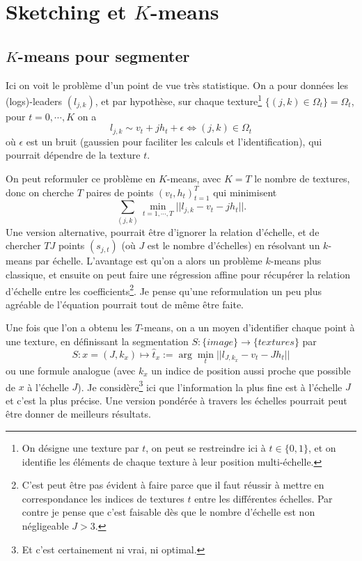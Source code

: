 \documentclass[11pt]{article} %
\begin{document}
\section{Sketching et $K$-means}
\subsection{$K$-means pour segmenter}
Ici on voit le problème d'un point de vue très statistique. On a pour données les (logs)-leaders $(l_{j,k})$, et par hypothèse, sur chaque texture\footnote{On désigne une texture par $t$, on peut se restreindre ici à $t\in \{0,1\}$, et on identifie les éléments de chaque texture à leur position multi-échelle.} $\{(j,k) \in \Omega_t\} = \Omega_t$, pour $t = 0,\cdots, K$ on a
\begin{equation}
	l_{j,k} \sim v_t + jh_t + \epsilon \iff (j,k)\in\Omega_t
\end{equation}
où $\epsilon$ est un bruit (gaussien pour faciliter les calculs et l'identification), qui pourrait dépendre de la texture $t$.
\par
On peut reformuler ce problème en $K$-means, avec $K=T$ le nombre de textures, donc on cherche $T$ paires de points $(v_t, h_t)_{t=1}^T$ qui minimisent
\begin{equation}
	\sum_{(j,k)} \min_{t=1,\cdots,T} || l_{j,k} - v_t - jh_t||.
\end{equation}
Une version alternative, pourrait être d'ignorer la relation d'échelle, et de chercher $TJ$  points $(s_{j,t})$ (où $J$ est le nombre d'échelles) en résolvant un $k$-means par échelle. L'avantage est qu'on a alors un problème $k$-means plus classique, et ensuite on peut faire une régression affine pour récupérer la relation d'échelle entre les coefficients\footnote{C'est peut être pas évident à faire parce que il faut réussir à mettre en correspondance les indices de textures $t$ entre les différentes échelles. Par contre je pense que c'est faisable dès que le nombre d'échelle est non négligeable $J>3$.}. Je pense qu'une reformulation un peu plus agréable de l'équation pourrait tout de même être faite.
\par
Une fois que l'on a obtenu les $T$-means, on a un moyen d'identifier chaque point à une texture, en définissant la segmentation $S: \{image\} \to \{textures\}$ par
\begin{equation}
	S : x = (J,k_x) \mapsto \hat{t}_x:= \arg\min_t ||l_{J,k_x} - v_t -Jh_t||
\end{equation}
ou une formule analogue (avec $k_x$ un indice de position aussi proche que possible de $x$ à l'échelle $J$). Je considère\footnote{Et c'est certainement ni vrai, ni optimal.} ici que l'information la plus fine est à l'échelle $J$ et c'est la plus précise. Une version pondérée à travers les échelles pourrait peut être donner de meilleurs résultats.
\end{document}

